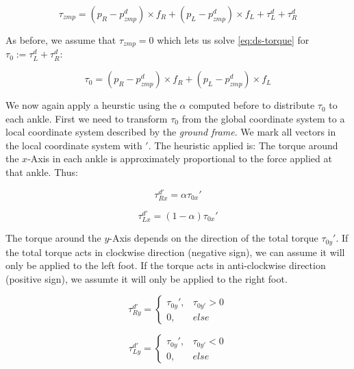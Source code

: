 \documentclass[english,ngerman]{KITreprt}
\newcommand{\clr}[2]{{\color{#1}{#2}}}
\newcommand{\todo}[1]{\marginpar{\clr{red}{#1}}}
\begin{document}
\begin{equation} \label{eq:ds-torque}
\tau_{zmp} = (p_R - p^d_{zmp}) \times f_R + (p_L - p^d_{zmp}) \times f_L + \tau^d_L + \tau^d_R
\end{equation}

As before, we assume that $\tau_{zmp} = 0$ which lets us solve
\ref{eq:ds-torque} for $\tau_0 := \tau^d_L + \tau^d_R$:

\begin{equation} \label{eq:tau0-torque}
\tau_0 = (p_R - p^d_{zmp}) \times f_R + (p_L - p^d_{zmp}) \times f_L
\end{equation}

\todo{define ground frame} We now again apply a heurstic using the
$\alpha$ computed before to distribute $\tau_0$ to each ankle. First we
need to transform $\tau_0$ from the global coordinate system to a local
coordinate system described by the \emph{ground frame}. We mark all
vectors in the local coordinate system with $'$. The heuristic applied
is: The torque around the $x$-Axis in each ankle is approximately
proportional to the force applied at that ankle. Thus:

\begin{equation} \label{eq:torque-right-x}
\tau^{d'}_{Rx} = \alpha \tau_{0x}'
\end{equation}

\begin{equation} \label{eq:torque-left-x}
\tau^{d'}_{Lx} = (1-\alpha) \tau_{0x}'
\end{equation}

The torque around the $y$-Axis depends on the direction of the total
torque $\tau_{0y}'$. If the total torque acts in clockwise direction
(negative sign), we can assume it will only be applied to the left foot.
If the torque acts in anti-clockwise direction (positive sign), we
assumte it will only be applied to the right foot.

\begin{equation} \label{eq:torque-right-x}
\tau^{d'}_{Ry} = \left\{
\begin{array}{lr}
\tau_{0y}', & \tau_{0y'} > 0 \\
0, & else
\end{array}
\right.
\end{equation}

\begin{equation} \label{eq:torque-left-x}
\tau^{d'}_{Ly} = \left\{
\begin{array}{lr}
\tau_{0y}', & \tau_{0y'} < 0 \\
0, & else
\end{array}
\right.
\end{equation}
\end{document}
